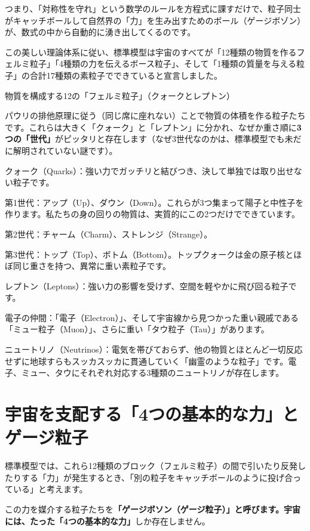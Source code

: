 つまり、「対称性を守れ」という数学のルールを方程式に課すだけで、粒子同士がキャッチボールして自然界の「力」を生み出すためのボール（ゲージボゾン）が、数式の中から自動的に湧き出してくるのです。

この美しい理論体系に従い、標準模型は宇宙のすべてが「12種類の物質を作るフェルミ粒子」「4種類の力を伝えるボース粒子」、そして「1種類の質量を与える粒子」の合計17種類の素粒子でできていると宣言しました。

物質を構成する12の「フェルミ粒子」（クォークとレプトン）

パウリの排他原理に従う（同じ席に座れない）ことで物質の体積を作る粒子たちです。これらは大きく「クォーク」と「レプトン」に分かれ、なぜか重さ順に\textbf{3つの「世代」}がピッタリと存在します（なぜ3世代なのかは、標準模型でも未だに解明されていない謎です）。

クォーク（Quarks）：強い力でガッチリと結びつき、決して単独では取り出せない粒子です。

第1世代：アップ（Up）、ダウン（Down）。これらが3つ集まって陽子と中性子を作ります。私たちの身の回りの物質は、実質的にこの2つだけでできています。

第2世代：チャーム（Charm）、ストレンジ（Strange）。

第3世代：トップ（Top）、ボトム（Bottom）。トップクォークは金の原子核とほぼ同じ重さを持つ、異常に重い素粒子です。

レプトン（Leptons）：強い力の影響を受けず、空間を軽やかに飛び回る粒子です。

電子の仲間：「電子（Electron）」、そして宇宙線から見つかった重い親戚である「ミュー粒子（Muon）」、さらに重い「タウ粒子（Tau）」があります。

ニュートリノ（Neutrinos）：電気を帯びておらず、他の物質とほとんど一切反応せずに地球すらもスッカスッカに貫通していく「幽霊のような粒子」です。電子、ミュー、タウにそれぞれ対応する3種類のニュートリノが存在します。

\section{宇宙を支配する「4つの基本的な力」とゲージ粒子}

標準模型では、これら12種類のブロック（フェルミ粒子）の間で引いたり反発したりする「力」が発生するとき、「別の粒子をキャッチボールのように投げ合っている」と考えます。

この力を媒介する粒子たちを\textbf{「ゲージボソン（ゲージ粒子）」と呼びます。宇宙には、たった「4つの基本的な力」}しか存在しません。

